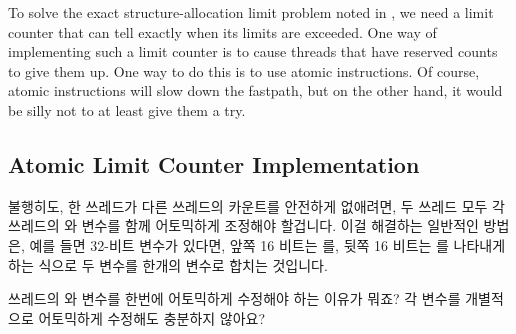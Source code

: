 To solve the exact structure-allocation limit problem noted in
{\QQexactcnt},
we need a limit counter that can tell exactly when its limits are
exceeded.
One way of implementing such a limit counter is to
cause threads that have reserved counts to give them up.
One way to do this is to use atomic instructions.
Of course, atomic instructions will slow down the fastpath, but on the
other hand, it would be silly not to at least give them a try.
\fi

\subsection{Atomic Limit Counter Implementation}
\label{sec:count:Atomic Limit Counter Implementation}

불행히도, 한 쓰레드가 다른 쓰레드의 카운트를 안전하게 없애려면, 두 쓰레드 모두
각 쓰레드의  와  변수를 함께 어토믹하게 조정해야
할겁니다.
이걸 해결하는 일반적인 방법은, 예를 들면 32-비트 변수가 있다면, 앞쪽 16 비트는
를, 뒷쪽 16 비트는  를 나타내게 하는 식으로 두
변수를 한개의 변수로 합치는 것입니다.

\QuickQuiz{}
	쓰레드의  와  변수를 한번에 어토믹하게
	수정해야 하는 이유가 뭐죠?
	각 변수를 개별적으로 어토믹하게 수정해도 충분하지 않아요?
	\iffalse

